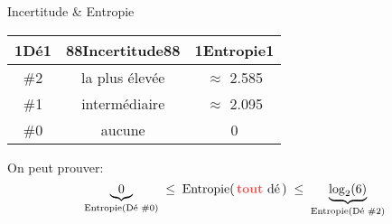 \begin{frame}{\Huge Incertitude \& Entropie}
\LARGE

\begin{center}
\vskip 0.3cm
\begin{tabular}{|c|c|c|}
\hline
{\color{white}1}D\'e{\color{white}1} & {\color{white}88}Incertitude{\color{white}88} & {\color{white}1}Entropie{\color{white}1} \\
\hline \hline
\#2 & la plus \'elev\'ee & $\approx$ 2.585 \\
\#1 & interm\'ediaire  & $\approx$ 2.095 \\
\#0 & aucune          & 0 \\
\hline
\end{tabular}
\end{center}

\vskip 0.5cm
\pause
\Large
On peut prouver:
\begin{equation*}
\underset{\textnormal{Entropie}(\textnormal{D\'e \#0})}{\underbrace{0}}
\;\leq\;\textnormal{Entropie}(\,\textnormal{\textbf{\color{customRed}tout} d\'e}\,)
\;\leq\;\underset{\textnormal{Entropie}(\textnormal{D\'e \#2})}{\underbrace{\log_{2}(6)}}
\end{equation*}

\normalsize
\end{frame}


